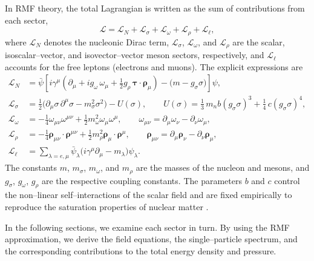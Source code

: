In RMF theory, the total Lagrangian is written as the sum of contributions from
each sector,
\begin{equation}
\mathcal{L}
= \mathcal{L}_{N}
+ \mathcal{L}_{\sigma}
+ \mathcal{L}_{\omega}
+ \mathcal{L}_{\rho}
+ \mathcal{L}_{\ell},
\label{eq:L_total}
\end{equation}
where $\mathcal{L}_{N}$ denotes the nucleonic Dirac term, 
$\mathcal{L}_{\sigma}$, $\mathcal{L}_{\omega}$, and $\mathcal{L}_{\rho}$ are the
scalar, isoscalar–vector, and isovector–vector meson sectors, respectively, and
$\mathcal{L}_{\ell}$ accounts for the free leptons (electrons and muons).  The
explicit expressions are
\begin{align}
\mathcal{L}_{N}
&= 
\bar{\psi}\!\left[
i\gamma^{\mu}\!\left(\partial_{\mu}
+ i g_{\omega}\,\omega_{\mu}
+ \tfrac{1}{2} g_{\rho}\,\boldsymbol{\tau}\!\cdot\!\boldsymbol{\rho}_{\mu}\right)
- \bigl(m - g_{\sigma}\sigma\bigr)
\right]\!\psi,
\label{eq:L_N}\\[0.5em]
\mathcal{L}_{\sigma}
&=
\frac{1}{2}\bigl(\partial_{\mu}\sigma\,\partial^{\mu}\sigma - m_{\sigma}^{2}\sigma^{2}\bigr)
- U(\sigma),
\qquad
U(\sigma)
= \frac{1}{3}\,m_{n}b(g_{\sigma}\sigma)^{3}
+ \frac{1}{4}\,c(g_{\sigma}\sigma)^{4},
\label{eq:L_sigma}\\[0.5em]
\mathcal{L}_{\omega}
&=
-\frac{1}{4}\omega_{\mu\nu}\omega^{\mu\nu}
+\frac{1}{2}m_{\omega}^{2}\omega_{\mu}\omega^{\mu},
\qquad
\omega_{\mu\nu}=\partial_{\mu}\omega_{\nu}-\partial_{\nu}\omega_{\mu},
\label{eq:L_omega}\\[0.5em]
\mathcal{L}_{\rho}
&=
-\frac{1}{4}\boldsymbol{\rho}_{\mu\nu}\!\cdot\!\boldsymbol{\rho}^{\mu\nu}
+\frac{1}{2}m_{\rho}^{2}\boldsymbol{\rho}_{\mu}\!\cdot\!\boldsymbol{\rho}^{\mu},
\qquad
\boldsymbol{\rho}_{\mu\nu}
=\partial_{\mu}\boldsymbol{\rho}_{\nu}-\partial_{\nu}\boldsymbol{\rho}_{\mu},
\label{eq:L_rho}\\[0.5em]
\mathcal{L}_{\ell}
&=
\sum_{\lambda=e,\mu}
\bar{\psi}_{\lambda}\bigl(i\gamma^{\mu}\partial_{\mu}-m_{\lambda}\bigr)\psi_{\lambda}.
\label{eq:L_leptons}
\end{align}
The constants $m$, $m_{\sigma}$, $m_{\omega}$, and $m_{\rho}$ are the masses of
the nucleon and mesons, and $g_{\sigma}$, $g_{\omega}$, $g_{\rho}$ are the
respective coupling constants.  The parameters $b$ and $c$ control the
non–linear self–interactions of the scalar field and are fixed empirically to
reproduce the saturation properties of nuclear matter
\cite{glendenning2000}.

In the following sections, we examine each sector in turn. By using the
RMF approximation, we derive the field
equations, the single–particle spectrum, and the corresponding contributions to
the total energy density and pressure. 

